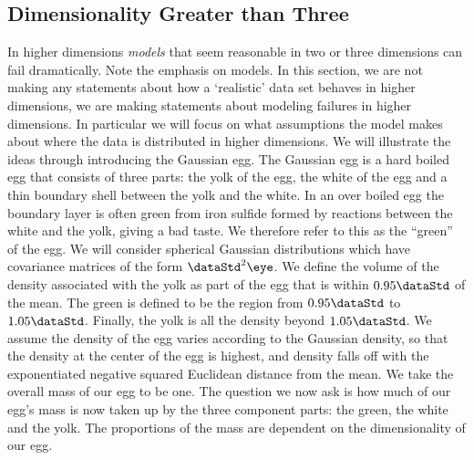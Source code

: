 \subsection{Dimensionality Greater than Three}

In higher dimensions \emph{models} that seem reasonable in two or
three dimensions can fail dramatically. Note the emphasis on models.
In this section, we are not making any statements about how a
`realistic' data set behaves in higher dimensions, we are making
statements about modeling failures in higher dimensions. In particular
we will focus on what assumptions the model makes about where the data
is distributed in higher dimensions. We will illustrate the ideas
through introducing the Gaussian egg. The Gaussian egg is a hard
boiled egg that consists of three parts: the yolk of the egg, the
white of the egg and a thin boundary shell between the yolk and the
white.  In an over boiled egg the boundary layer is often green from
iron sulfide formed by reactions between the white and the yolk,
giving a bad taste. We therefore refer to this as the ``green'' of the
egg. We will consider spherical Gaussian distributions which have
covariance matrices of the form $\dataStd^2\eye$. We define the
volume of the density associated with the yolk as part of the egg that
is within $0.95\dataStd$ of the mean. The green is defined to be the
region from $0.95\dataStd$ to $1.05\dataStd$. Finally, the yolk is all
the density beyond $1.05\dataStd$. We assume the density of the egg
varies according to the Gaussian density, so that the density at the
center of the egg is highest, and density falls off with the
exponentiated negative squared Euclidean distance from the mean. We
take the overall mass of our egg to be one. The question we now ask is
how much of our egg's mass is now taken up by the three component
parts: the green, the white and the yolk. The proportions of the mass
are dependent on the dimensionality of our egg.

